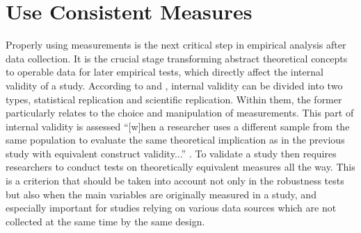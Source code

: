 
\section{Use Consistent Measures}
Properly using measurements is the next critical step in empirical analysis after data collection. It is the crucial stage transforming abstract theoretical concepts to operable data for later empirical tests, which directly affect the internal validity of a study. According to \cite{Hunter2001} and \cite{Hamermesh2007}, internal validity can be divided into two types, statistical replication and scientific replication. Within them, the former particularly relates to the choice and manipulation of measurements. This part of internal validity is assessed ``[w]hen a researcher uses a different sample from the same population to evaluate the same theoretical implication as in the previous study with equivalent construct validity...'' \cite[258]{Morton2010}. To validate a study then requires researchers to conduct tests on theoretically equivalent measures all the way. This is a criterion that should be taken into account not only in the robustness tests but also when the main variables are originally measured in a study, and especially important for studies relying on various data sources which are not collected at the same time by the same design. 


